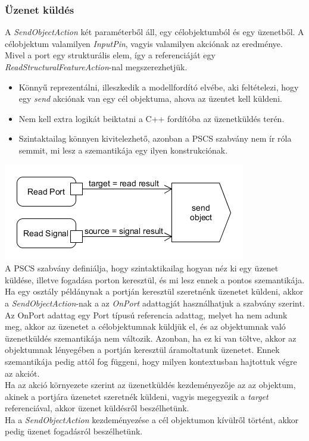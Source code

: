 \documentclass[a4paper,12pt]{report}
\begin{document}
\subsubsection{Üzenet küldés}
A  \textit{SendObjectAction} két paraméterből áll, egy célobjektumból és egy üzenetből.
A célobjektum valamilyen \textit{InputPin}, vagyis valamilyen akciónak az eredménye.
Mivel a port egy strukturális elem, így a referenciáját egy \textit{ReadStructuralFeatureAction}-nal megszerezhetjük. 
\begin{itemize}
\item Könnyű reprezentálni, illeszkedik a modellfordító elvébe, aki feltételezi, hogy
egy \textit{send} akciónak van egy cél objektuma, ahova az üzentet kell küldeni.
\item Nem kell extra logikát beiktatni a C++ fordítóba az üzenetküldés terén.
\item Szintaktailag könnyen kivitelezhető, azonban a PSCS szabvány nem ír róla semmit, mi lesz a szemantikája egy ilyen konstrukciónak.
\end{itemize}

\includegraphics[scale=0.8]{send_uml.png} \\

A PSCS szabvány definiálja, hogy szintaktikailag hogyan néz ki egy üzenet küldése, illetve fogadása porton keresztül, és mi lesz ennek a pontos szemantikája. \\
Ha egy osztály példánynak a portján keresztül szeretnénk üzenetet küldeni, akkor a \textit{SendObjectAction}-nak a az \textit{OnPort} adattagját használhatjuk a szabvány szerint.  Az OnPort adattag egy Port típusú referencia adattag, melyet ha nem adunk meg, akkor az üzenetet a célobjektumnak küldjük el, és az objektumnak való üzenetküldés szemantikája nem változik.  Azonban, ha ez ki van töltve, akkor az objektumnak lényegében a portján keresztül áramoltatunk üzenetet. Ennek szemantikája pedig attól fog függeni, hogy milyen kontextusban hajtottuk végre az akciót. \\

Ha az akció környezete szerint az üzenetküldés kezdeményezője az az objektum, akinek a portjára üzenetet szeretnék küldeni, vagyis megegyezik a \textit{target} referenciával, akkor üzenet küldésről beszélhetünk. \\
Ha a \textit{SendObjectAction} kezdeményezése a cél objektumon kívülről történt, akkor pedig üzenet fogadásról beszélhetünk. \\
 
\end{document}
